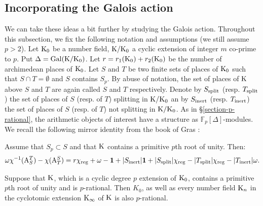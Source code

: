 \documentclass[12pt,a4paper,twoside,english]{smfart}
\def\K{{\rm K}}
\def\fq{{\mathbb F}}
\def\Gal{{\rm Gal}}
\def\inert{{\rm inert}}
\def\split{{\rm split}}
\def\A{{\rm A}}
\def\1{{\bf 1}}
\newenvironment{Hypotheses}{\begin{enonce}{Hypotheses}}{\end{enonce}}
\begin{document}
\medskip


\subsection{Incorporating the Galois action}
We can take these ideas a bit further by studying the Galois action.
Throughout this subsection, we fix the following notation and assumptions (we still assume $p>2$).
Let $\K_0$ be a number field, $\K/\K_0$ a cyclic extension of integer $m$ co-prime to $p$. 
Put  $\Delta=\Gal(\K/\K_0)$.
Let $r=r_1(\K_0)+r_2(\K_0)$ be the number of archimedean places of $\K_0$.
Let $S$ and $T$ be two finite sets of places of $\K_0$ such that $S\cap T =\emptyset$ and $S$ contains $S_p$. By abuse of notation, the set of places of  $\K$ above $S$ and $T$ are again called $S$ and $T$ respectively.
Denote by  $S_{\split}$ (resp. $T_{\split}$) the set of places of $S$ (resp. of $T$) splitting in
 $\K/\K_0$ an by  $S_{\inert}$ (resp. $T_{\inert}$)  the set of places of $S$ (resp. of $T$) not splitting in  $\K/\K_0$.
As in \S \ref{section-p-rational}, the arithmetic objects of interest have a structure  as $\fq_p[\Delta]$-modules. 
We recall the following mirror identity from the book of  Gras \cite[Chapter II, \S 5.4.2]{gras2}:

\begin{theo}\label{caracteres} Assume that $S_p \subset S$ and that  $\K$ contains a primitive $p$th root  of unity. Then:
 $$\omega \chi^{-1}(\A_S^T)-\chi(\A_T^S)= r \chi_{\mathrm{reg}} + \omega -\1 + |S_{\inert}| \1 + |S_{\split}| \chi_{\mathrm{reg}} - |T_{\split}|\chi_{\mathrm{reg}} - |T_{\inert}| \omega.$$
\end{theo}



 
 
 \begin{prop} \label{cyclotomicextension}
 
 Suppose that $\K$, which is a cyclic degree $p$ extension of $\K_0$,  contains a primitive $p$th root of unity and is $p$-rational.  Then 
 $K_0$, as well as every number field $\K_n$ in the cyclotomic extension  $\K_\infty$ of $\K$ is also $p$-rational.
 
  
 \end{prop}
 
\end{document}
